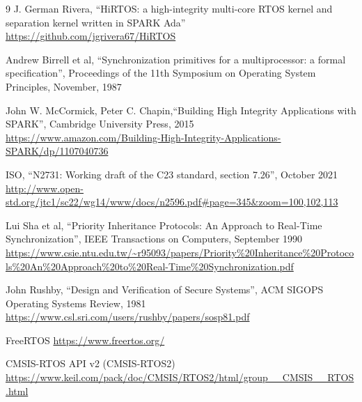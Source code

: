\documentclass{AUJarticle}
\begin{document}
\begin{thebibliography}{9}
J. German Rivera, ``HiRTOS: a high-integrity multi-core RTOS kernel and separation kernel written in SPARK Ada'' \\
\url{https://github.com/jgrivera67/HiRTOS}


Andrew Birrell et al, ``Synchronization primitives for a multiprocessor: a formal specification'',
Proceedings of the 11th Symposium on Operating System Principles, November, 1987

John W. McCormick, Peter C. Chapin,``Building High Integrity Applications with SPARK'', Cambridge University Press, 2015 \\
\url{https://www.amazon.com/Building-High-Integrity-Applications-SPARK/dp/1107040736}

ISO, ``N2731: Working draft of the C23 standard, section 7.26'', October 2021 \\
\url{http://www.open-std.org/jtc1/sc22/wg14/www/docs/n2596.pdf#page=345&zoom=100,102,113}

Lui Sha et al, ``Priority Inheritance Protocols: An Approach to Real-Time Synchronization'', IEEE Transactions on Computers, September 1990 \\
\url{https://www.csie.ntu.edu.tw/~r95093/papers/Priority%20Inheritance%20Protocols%20An%20Approach%20to%20Real-Time%20Synchronization.pdf}

John Rushby, ``Design and Verification of Secure Systems'', ACM SIGOPS Operating Systems Review, 1981 \\
\url{https://www.csl.sri.com/users/rushby/papers/sosp81.pdf}

FreeRTOS
\url{https://www.freertos.org/}

CMSIS-RTOS API v2 (CMSIS-RTOS2)
\url{https://www.keil.com/pack/doc/CMSIS/RTOS2/html/group__CMSIS__RTOS.html}

\end{thebibliography}
\end{document}
